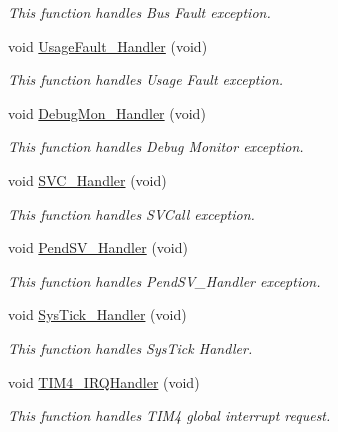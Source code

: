 \begin{DoxyCompactItemize}
\begin{DoxyCompactList}\small\item\em This function handles Bus Fault exception. \end{DoxyCompactList}\item 
void \hyperlink{group___t_i_m___p_w_m___input_ga1d98923de2ed6b7309b66f9ba2971647}{Usage\-Fault\-\_\-\-Handler} (void)
\begin{DoxyCompactList}\small\item\em This function handles Usage Fault exception. \end{DoxyCompactList}\item 
void \hyperlink{group___t_i_m___p_w_m___input_gadbdfb05858cc36fc520974df37ec3cb0}{Debug\-Mon\-\_\-\-Handler} (void)
\begin{DoxyCompactList}\small\item\em This function handles Debug Monitor exception. \end{DoxyCompactList}\item 
void \hyperlink{group___t_i_m___p_w_m___input_ga3e5ddb3df0d62f2dc357e64a3f04a6ce}{S\-V\-C\-\_\-\-Handler} (void)
\begin{DoxyCompactList}\small\item\em This function handles S\-V\-Call exception. \end{DoxyCompactList}\item 
void \hyperlink{group___t_i_m___p_w_m___input_ga6303e1f258cbdc1f970ce579cc015623}{Pend\-S\-V\-\_\-\-Handler} (void)
\begin{DoxyCompactList}\small\item\em This function handles Pend\-S\-V\-\_\-\-Handler exception. \end{DoxyCompactList}\item 
void \hyperlink{group___t_i_m___p_w_m___input_gab5e09814056d617c521549e542639b7e}{Sys\-Tick\-\_\-\-Handler} (void)
\begin{DoxyCompactList}\small\item\em This function handles Sys\-Tick Handler. \end{DoxyCompactList}\item 
void \hyperlink{group___t_i_m___p_w_m___input_ga7133f3f78767503641d307386e68bd28}{T\-I\-M4\-\_\-\-I\-R\-Q\-Handler} (void)
\begin{DoxyCompactList}\small\item\em This function handles T\-I\-M4 global interrupt request. \end{DoxyCompactList}\end{DoxyCompactItemize}
